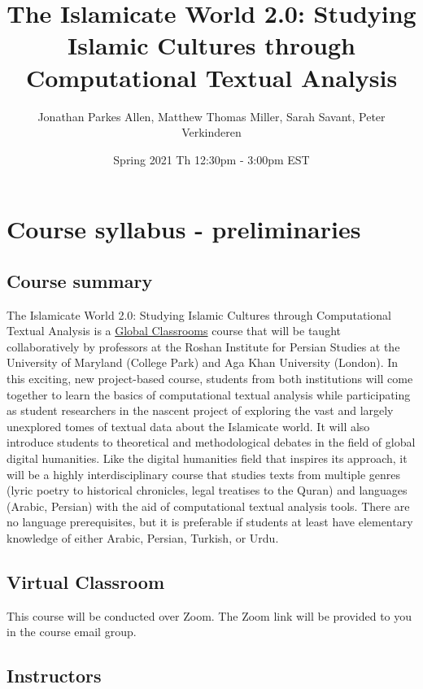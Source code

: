 \documentclass[
]{book}
\title{The Islamicate World 2.0: Studying Islamic Cultures through Computational Textual Analysis}
\author{Jonathan Parkes Allen, Matthew Thomas Miller, Sarah Savant, Peter Verkinderen}
\date{Spring 2021 Th 12:30pm - 3:00pm EST}
\begin{document}
\maketitle

{
\setcounter{tocdepth}{1}
\tableofcontents
}
\hypertarget{course-syllabus---preliminaries}{%
\chapter{Course syllabus - preliminaries}\label{course-syllabus---preliminaries}}

\hypertarget{course-summary}{%
\section{Course summary}\label{course-summary}}

The Islamicate World 2.0: Studying Islamic Cultures through Computational Textual Analysis is a \href{https://globalmaryland.umd.edu/content/global-classrooms}{Global Classrooms} course that will be taught collaboratively by professors at the Roshan Institute for Persian Studies at the University of Maryland (College Park) and Aga Khan University (London). In this exciting, new project-based course, students from both institutions will come together to learn the basics of computational textual analysis while participating as student researchers in the nascent project of exploring the vast and largely unexplored tomes of textual data about the Islamicate world. It will also introduce students to theoretical and methodological debates in the field of global digital humanities. Like the digital humanities field that inspires its approach, it will be a highly interdisciplinary course that studies texts from multiple genres (lyric poetry to historical chronicles, legal treatises to the Quran) and languages (Arabic, Persian) with the aid of computational textual analysis tools. There are no language prerequisites, but it is preferable if students at least have elementary knowledge of either Arabic, Persian, Turkish, or Urdu.

\hypertarget{virtual-classroom}{%
\section{Virtual Classroom}\label{virtual-classroom}}

This course will be conducted over Zoom. The Zoom link will be provided to you in the course email group.

\hypertarget{instructors}{%
\section{Instructors}\label{instructors}}
\end{document}
